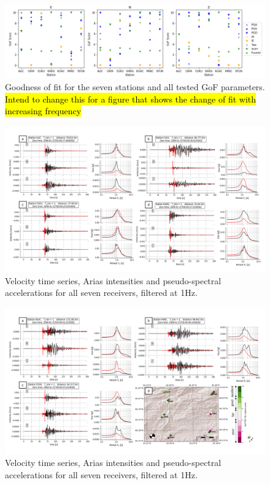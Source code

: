 \documentclass[../Text/00main.tex]{subfiles}
\begin{document}
\begin{figure}
    \centering
    \includegraphics[width=\linewidth]{images_results/Gofsevenstations.png}
    \caption{Goodness of fit for the seven stations and all tested GoF parameters. \hl{Intend to change this for a figure that shows the change of fit with increasing frequency}}
    \label{fig:GoFsevenstations}
\end{figure}



\begin{figure}
    \includegraphics[width=\textwidth]{images_results/monsterfigure_part1.png}
  \caption{Velocity time series, Arias intensities and pseudo-spectral accelerations for all seven receivers, filtered at 1Hz. }
  \label{fig:monsterfigurea}
\end{figure}


\begin{figure}

    \includegraphics[width=\textwidth]{images_results/monsterfigure_part2.png}
  \caption{Velocity time series, Arias intensities and pseudo-spectral accelerations for all seven receivers, filtered at 1Hz.}
  \label{fig:monsterfigureb}
\end{figure}
\end{document}
